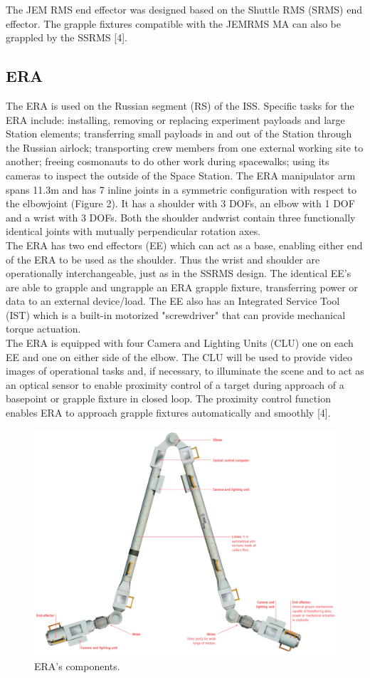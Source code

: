 \documentclass[a4paper,12pt,oneside]{report}
\begin{document}
The JEM RMS end effector was designed based on the Shuttle RMS (SRMS) end effector. The grapple fixtures compatible with the JEMRMS MA can also be grappled by the SSRMS [4].\\
\subsection{ERA}
The ERA is used on the Russian segment (RS) of the ISS. Specific tasks for the ERA include: installing, removing or replacing experiment payloads
and large Station elements; transferring small payloads in and out of the Station through the Russian airlock; transporting crew members from one external working site
to another; freeing cosmonauts to do other work during spacewalks; using its cameras to inspect the outside of the Space Station.
The ERA manipulator arm spans 11.3m and has 7 inline joints in a symmetric configuration with respect to the elbowjoint (Figure 2). It has a shoulder with 3 DOFs, an elbow with 1 DOF and a wrist with 3 DOFs. Both the shoulder andwrist contain three functionally identical joints with mutually perpendicular rotation axes.\\
The ERA has two end effectors (EE) which can act as a base, enabling either end of the ERA to be used as the shoulder. Thus the wrist and shoulder are operationally interchangeable, just as in the SSRMS design. The identical EE’s are able to grapple and ungrapple an ERA grapple fixture, transferring power or data to an external device/load. The EE also has an Integrated Service Tool (IST) which is a built-in motorized "screwdriver" that can provide mechanical torque
actuation.\\
The ERA is equipped with four Camera and Lighting Units (CLU) one on each EE and one on either side of the elbow. The CLU will be used to provide video images of operational tasks and, if necessary, to illuminate the scene and to act as an optical sensor to enable proximity control of a target during approach of a basepoint or grapple fixture in closed loop. The proximity control function enables ERA to approach grapple fixtures automatically and smoothly [4].
\begin{figure}[h]
  \centering
  \includegraphics[scale=0.45]{ERA.png}
  \caption{ERA's components.} \label{ERA}
\end{figure}
\end{document}
